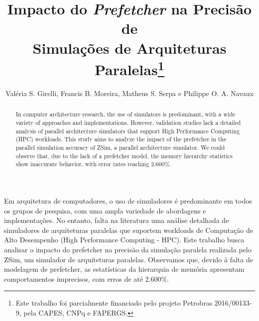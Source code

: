 \documentclass[12pt]{article}
\begin{document}
\sloppy

\title{Impacto do \textit{Prefetcher} na Precisão de\\ Simulações de Arquiteturas Paralelas\footnote{Este trabalho foi parcialmente financiado pelo projeto Petrobras 2016/00133-9, pela CAPES, CNPq e FAPERGS.}}

\author{Valéria S. Girelli, Francis B. Moreira, Matheus S. Serpa e Philippe O. A. Navaux }


\address{Instituto de Informática -- Universidade Federal do Rio Grande do Sul (UFRGS)\\
	Caixa Postal 15.064 -- 91.501-970, Porto Alegre -- RS -- Brasil
}

\maketitle



\begin{abstract}
In computer architecture research, the use of simulators is predominant, with a wide variety of approaches and implementations. 
However, validation studies lack a detailed analysis of parallel architecture simulators that support High Performance Computing (HPC) workloads. 
This study aims to analyze the impact of the prefetcher in the parallel simulation accuracy of ZSim, a parallel architecture simulator.
We could observe that, due to the lack of a prefetcher model, the memory hierarchy statistics show inaccurate behavior, with error rates reaching 2,600\%.
\end{abstract}

\vspace{-2mm}
\begin{resumo} 
Em arquitetura de computadores, o uso de simuladores é predominante em todos os grupos de pesquisa, com uma ampla variedade de abordagens e implementações.%
No entanto, falta na literatura uma análise detalhada de simuladores de arquiteturas paralelas que suportem workloads de Computação de Alto Desempenho (High Performance Computing - HPC). %
Este trabalho busca analisar o impacto do prefetcher na precisão da simulação paralela realizada pelo ZSim, um simulador de arquiteturas paralelas.
Observamos que, devido à falta de modelagem de prefetcher, as estatísticas da hierarquia de memória apresentam comportamentos imprecisos, com erros de até 2.600\%. 

\end{resumo}
\end{document}
